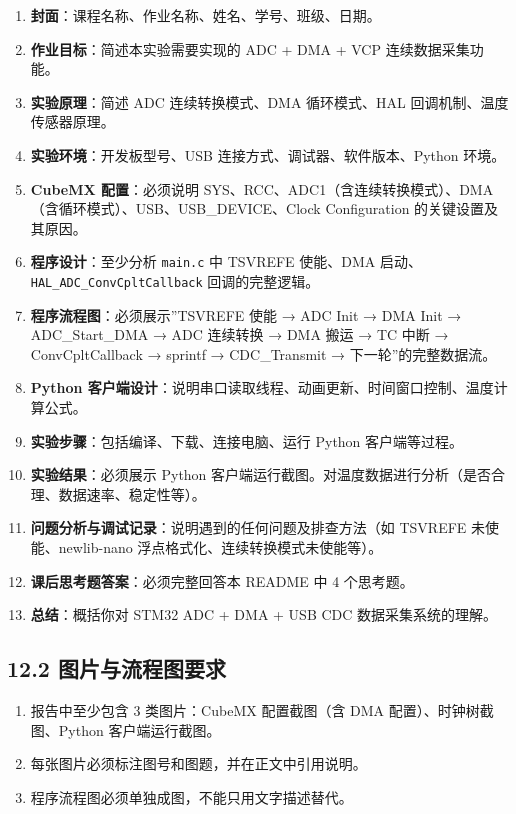 \documentclass[
  chinese,
  UTF8,
  oneside,
  openany]{ctexbook}
\providecommand{\tightlist}{%
  \setlength{\itemsep}{0pt}\setlength{\parskip}{0pt}}
\begin{document}
\begin{enumerate}
\def\labelenumi{\arabic{enumi}.}
\tightlist
\item
  \textbf{封面}：课程名称、作业名称、姓名、学号、班级、日期。
\item
  \textbf{作业目标}：简述本实验需要实现的 ADC + DMA + VCP
  连续数据采集功能。
\item
  \textbf{实验原理}：简述 ADC 连续转换模式、DMA 循环模式、HAL
  回调机制、温度传感器原理。
\item
  \textbf{实验环境}：开发板型号、USB 连接方式、调试器、软件版本、Python
  环境。
\item
  \textbf{CubeMX 配置}：必须说明
  SYS、RCC、ADC1（含连续转换模式）、DMA（含循环模式）、USB、USB\_DEVICE、Clock
  Configuration 的关键设置及其原因。
\item
  \textbf{程序设计}：至少分析 \texttt{main.c} 中 TSVREFE 使能、DMA
  启动、\texttt{HAL\_ADC\_ConvCpltCallback} 回调的完整逻辑。
\item
  \textbf{程序流程图}：必须展示''TSVREFE 使能 → ADC Init → DMA Init →
  ADC\_Start\_DMA → ADC 连续转换 → DMA 搬运 → TC 中断 → ConvCpltCallback
  → sprintf → CDC\_Transmit → 下一轮''的完整数据流。
\item
  \textbf{Python
  客户端设计}：说明串口读取线程、动画更新、时间窗口控制、温度计算公式。
\item
  \textbf{实验步骤}：包括编译、下载、连接电脑、运行 Python
  客户端等过程。
\item
  \textbf{实验结果}：必须展示 Python
  客户端运行截图。对温度数据进行分析（是否合理、数据速率、稳定性等）。
\item
  \textbf{问题分析与调试记录}：说明遇到的任何问题及排查方法（如 TSVREFE
  未使能、newlib-nano 浮点格式化、连续转换模式未使能等）。
\item
  \textbf{课后思考题答案}：必须完整回答本 README 中 4 个思考题。
\item
  \textbf{总结}：概括你对 STM32 ADC + DMA + USB CDC 数据采集系统的理解。
\end{enumerate}

\subsection{12.2
图片与流程图要求}\label{ux56feux7247ux4e0eux6d41ux7a0bux56feux8981ux6c42-5}

\begin{enumerate}
\def\labelenumi{\arabic{enumi}.}
\tightlist
\item
  报告中至少包含 3 类图片：CubeMX 配置截图（含 DMA
  配置）、时钟树截图、Python 客户端运行截图。
\item
  每张图片必须标注图号和图题，并在正文中引用说明。
\item
  程序流程图必须单独成图，不能只用文字描述替代。
\end{enumerate}
\end{document}
